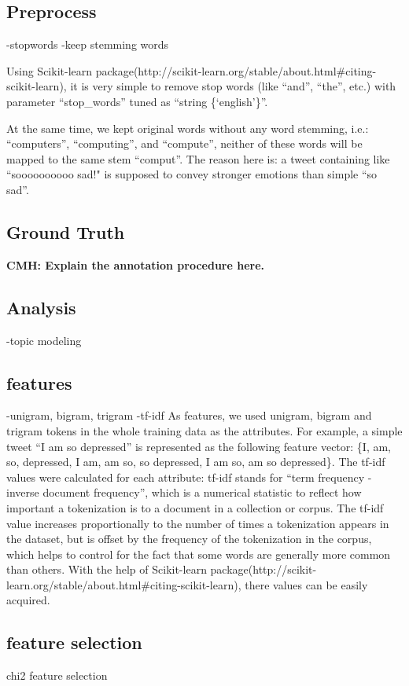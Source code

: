 \documentclass[11pt]{article}
\begin{document}
\subsection{Preprocess}
-stopwords
-keep stemming words

Using Scikit-learn package(http://scikit-learn.org/stable/about.html\#citing-scikit-learn), it is very simple to remove stop words (like ``and'', ``the'', etc.) with parameter ``stop\_words'' tuned as ``string \{`english'\}''. 

At the same time, we kept original words without any word stemming, i.e.: ``computers'', ``computing'', and ``compute'', neither of these words will be mapped to the same stem ``comput''. The reason here is: a tweet containing like ``soooooooooo sad!" is supposed to convey stronger emotions than simple ``so sad''.

\subsection{Ground Truth}
\textbf{CMH: Explain the annotation procedure here.}

 
\subsection{Analysis}
-topic modeling \cite{Blei}

\subsection{features}
-unigram, bigram, trigram
-tf-idf
As features, we used unigram, bigram and trigram tokens in the whole training data as the attributes. For example, a simple tweet ``I am so depressed'' is represented as the following feature vector: \{I, am, so, depressed, I am, am so, so depressed, I am so, am so depressed\}. The tf-idf values were calculated for each attribute: tf-idf stands for ``term frequency - inverse document frequency'', which is a numerical statistic to reflect how important a tokenization is to a document in a collection or corpus. The tf-idf value increases proportionally to the number of times a tokenization appears in the dataset, but is offset by the frequency of the tokenization in the corpus, which helps to control for the fact that some words are generally more common than others. With the help of Scikit-learn package(http://scikit-learn.org/stable/about.html\#citing-scikit-learn), there values can be easily acquired. 

\subsection{feature selection}
chi2 feature selection
\end{document}

